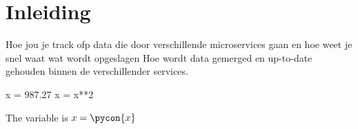 \documentclass{article}
\begin{document}
    
    \newpage
    \tableofcontents
    \newpage

    \clearpage
    \setcounter{page}{1}

    \chapter{Inleiding}
    \label{ch:inleiding}


    Hoe jou je track ofp data die door verschillende microservices gaan en hoe weet je snel waat wat wordt opgeslagen
    Hoe wordt data gemerged en up-to-date gehouden binnen de verschillender services.


\begin{pyconsole}
x = 987.27
x = x**2
\end{pyconsole}

The variable is $x=\pycon{x}$
\end{document}
